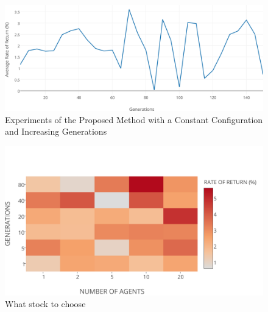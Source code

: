 \documentclass[a4paper,twoside]{article}
\begin{document}
\begin{figure}[h!]
\begin{center}
\includegraphics[width=1.00\columnwidth]{figures/avg-rate-of-return/avg-rate-of-return}
\caption{{\label{constant-configuration-generations}Experiments of the Proposed Method with a Constant Configuration and Increasing Generations%
}}
\end{center}
\end{figure}
%
\begin{figure}[h!]
\begin{center}
\includegraphics[width=1.00\columnwidth]{figures/rates-of-return-heatmap/rates-of-return-heatmap}
\caption{{\label{rates-of-return-heatmap}What stock to choose%
}}
\end{center}
\end{figure}


\end{document}
